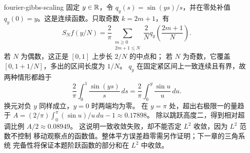 \begin{solution}{fourier-gibbs-scaling}
固定 \(y\in\mathbb{R}\)，令 \(q_y(s)=\sin(ys)/s\)，并在零处补值
\(q_y(0)=y\)。这是连续函数。只取奇数 \(k=2m+1\)，有
\[
 S_Nf(y/N)=\frac2\pi
 \sum_{\substack{m\ge0\\2m+1\le N}}\frac2N
 q_y\left(\frac{2m+1}{N}\right).
\]
若 \(N\) 为偶数，这正是 \([0,1]\) 上步长 \(2/N\) 的中点和；
若 \(N\) 为奇数，它覆盖 \([0,1+1/N]\)，多出的区间长度为 \(1/N\)。
\(q_y\) 在固定紧区间上一致连续且有界，故两种情形都趋于
\[
 \frac2\pi\int_0^1\frac{\sin(ys)}s\,ds
 =\frac2\pi\int_0^y\frac{\sin u}u\,du.
\]
换元对负 \(y\) 同样成立，\(y=0\) 时两端均为零。
在 \(y=\pi\) 处，超出右极限一的量趋于
\(A=(2/\pi)\int_0^\pi(\sin u)/u\,du-1\approx0.17898\)。
除以跳跃高度二，得到相对超调比例 \(A/2\approx0.08949\)。
这说明一致收敛失败，却不能否定 \(L^2\) 收敛，因为 \(L^2\) 范数不控制
移动观察点的函数值。整体平方误差趋零需另作证明；下一章的三角系统
完备性将保证本题阶跃函数的部分和在 \(L^2\) 中收敛。
\end{solution}
